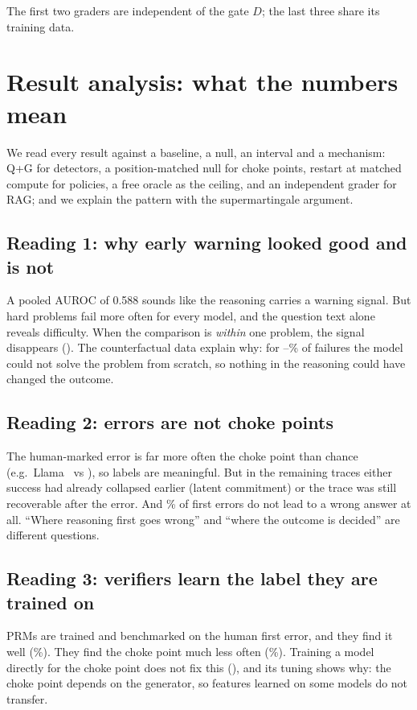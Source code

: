 \documentclass[11pt,a4paper]{article}
\begin{document}
The first two graders are independent of the gate $D$; the last three share its training data.

\section{Result analysis: what the numbers mean}\label{sec:analysis}
\begin{viva}
We read every result against a baseline, a null, an interval and a mechanism: Q+G for detectors,
a position-matched null for choke points, restart at matched compute for policies, a free oracle as
the ceiling, and an independent grader for RAG; and we explain the pattern with the supermartingale
argument.
\end{viva}

\subsection{Reading 1: why early warning looked good and is not}
A pooled AUROC of 0.588 sounds like the reasoning carries a warning signal. But hard problems fail
more often for every model, and the question text alone reveals difficulty. When the comparison is
\emph{within} one problem, the signal disappears (\wpPA). The counterfactual data explain why: for
\QwenSmallAllCapPct--\QwenMathCapPct\% of failures the model could not solve the problem from
scratch, so nothing in the reasoning could have changed the outcome.

\subsection{Reading 2: errors are not choke points}
The human-marked error is far more often the choke point than chance (e.g.\ Llama \LlamaDec\ vs
\LlamaDecNull), so labels are meaningful. But in the remaining traces either success had already
collapsed earlier (latent commitment) or the trace was still recoverable after the error. And
\nonFatalPct\% of first errors do not lead to a wrong answer at all. ``Where reasoning first goes
wrong'' and ``where the outcome is decided'' are different questions.

\subsection{Reading 3: verifiers learn the label they are trained on}
PRMs are trained and benchmarked on the human first error, and they find it well
(\cbPrmDropAccHPct\%). They find the choke point much less often (\cbPrmDropAccDPct\%). Training a
model directly for the choke point does not fix this (\cbLearnedAccD), and its tuning shows why: the
choke point depends on the generator, so features learned on some models do not transfer.
\end{document}
